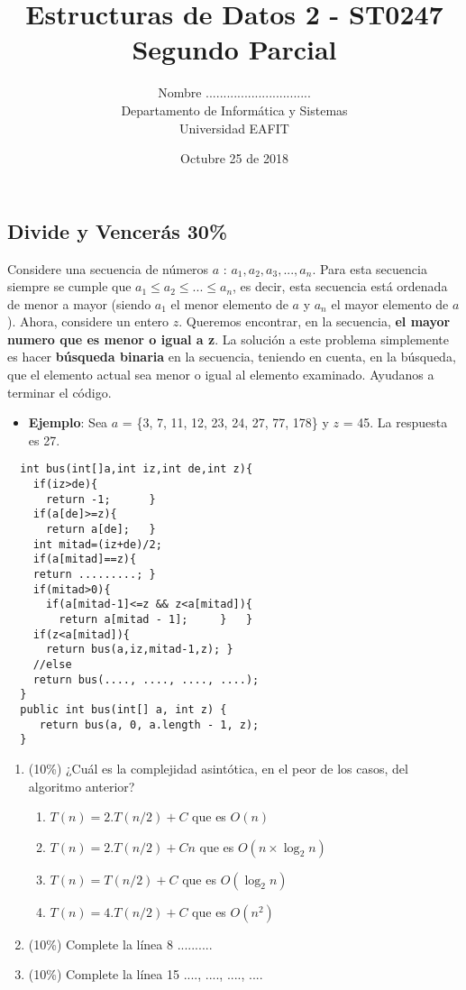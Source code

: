 \documentclass[10 pt]{article}
\title{\textbf {Estructuras de Datos 2 - ST0247\\Segundo Parcial}}
\author{Nombre ..............................\\
		Departamento de Informática y Sistemas\\
		Universidad EAFIT\\}
\date{Octubre 25 de 2018}
\begin{document}
\lstset{escapechar=@,style=customc, numbers=left, stepnumber = 1} 
\maketitle
\begin{multicols}{2}
\section{Divide y Vencerás 30\%}
Considere una secuencia de números $a$ : $a_1, a_2, a_3, ..., a_n$. Para esta secuencia siempre se cumple que $a_1 \leq a_2 \leq ... \leq a_n$, es decir, esta secuencia está ordenada de menor a mayor (siendo $a_1$ el menor elemento de $a$ y $a_n$ el mayor elemento de $a$). Ahora, considere un entero $z$. Queremos encontrar, en la secuencia, \textbf{el mayor numero que es menor o igual a z}. 
La solución a este problema simplemente es hacer \textbf{búsqueda binaria} en la secuencia, teniendo en cuenta, en la búsqueda, que el elemento actual sea menor o igual al elemento examinado. Ayudanos a terminar el  código.
\begin{itemize}
\item \textbf{Ejemplo}: Sea $a$ = \{3, 7, 11, 12, 23, 24, 27, 77, 178\} y $z$ = 45. La respuesta es 27. 
\end{itemize}
\begin{lstlisting}
  int bus(int[]a,int iz,int de,int z){
    if(iz>de){
      return -1;      }  
    if(a[de]>=z){
      return a[de];   }
    int mitad=(iz+de)/2;
    if(a[mitad]==z){
    return .........; }
    if(mitad>0){
      if(a[mitad-1]<=z && z<a[mitad]){
        return a[mitad - 1];     }   }
    if(z<a[mitad]){
      return bus(a,iz,mitad-1,z); }
    //else
    return bus(...., ...., ...., ....);
  }
  public int bus(int[] a, int z) {
     return bus(a, 0, a.length - 1, z);
  }
\end{lstlisting}
\begin{enumerate}[label=(\alph*)]
\item (10\%) ¿Cuál es la complejidad asintótica, en el peor de los casos, del algoritmo anterior?
\begin{enumerate}[label=(\roman*)]
\item $T(n) = 2.T(n/2) + C$ que es $O(n)$
\item $T(n) = 2.T(n/2) +Cn$ que es $O(n\times\log_2 n)$
\item $T(n) = T(n/2) + C$ que es $O(\log_2 n)$
\item $T(n) = 4.T(n/2) + C$ que es $O(n^2)$
\end{enumerate}
\item (10\%) Complete la línea 8 ..........
\item (10\%) Complete la línea 15 ...., ...., ...., ....
\end{enumerate}



\end{multicols}
\end{document}
